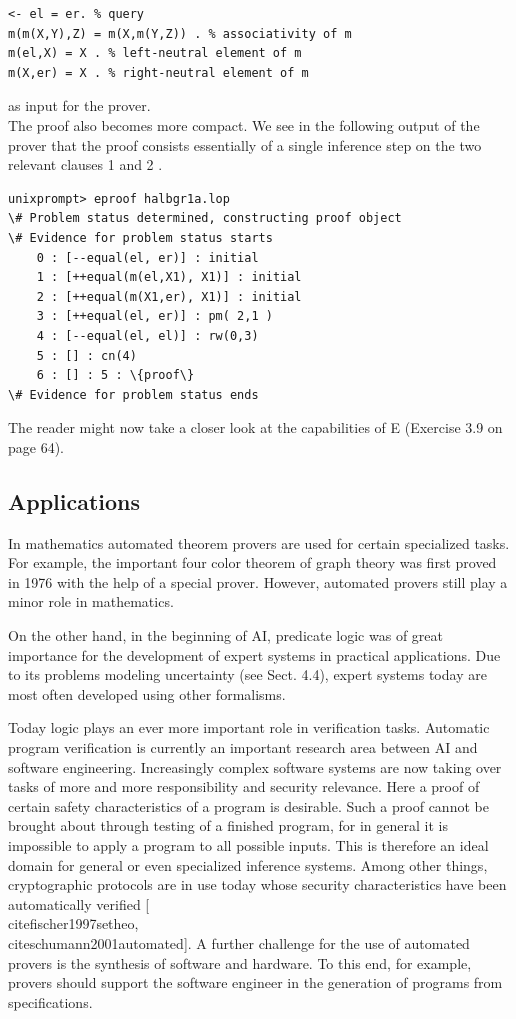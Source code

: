 \documentclass[10pt]{book}
\begin{document}
\begin{verbatim}
<- el = er. % query
m(m(X,Y),Z) = m(X,m(Y,Z)) . % associativity of m
m(el,X) = X . % left-neutral element of m
m(X,er) = X . % right-neutral element of m
\end{verbatim}

as input for the prover.\\
The proof also becomes more compact. We see in the following output of the prover that the proof consists essentially of a single inference step on the two relevant clauses 1 and 2 .

\begin{verbatim}
unixprompt> eproof halbgr1a.lop
\# Problem status determined, constructing proof object
\# Evidence for problem status starts
    0 : [--equal(el, er)] : initial
    1 : [++equal(m(el,X1), X1)] : initial
    2 : [++equal(m(X1,er), X1)] : initial
    3 : [++equal(el, er)] : pm( 2,1 )
    4 : [--equal(el, el)] : rw(0,3)
    5 : [] : cn(4)
    6 : [] : 5 : \{proof\}
\# Evidence for problem status ends
\end{verbatim}

The reader might now take a closer look at the capabilities of E (Exercise 3.9 on page 64).

\subsection*{Applications}
In mathematics automated theorem provers are used for certain specialized tasks. For example, the important four color theorem of graph theory was first proved in 1976 with the help of a special prover. However, automated provers still play a minor role in mathematics.

On the other hand, in the beginning of AI, predicate logic was of great importance for the development of expert systems in practical applications. Due to its problems modeling uncertainty (see Sect. 4.4), expert systems today are most often developed using other formalisms.


Today logic plays an ever more important role in verification tasks. Automatic program verification is currently an important research area between AI and software engineering. Increasingly complex software systems are now taking over tasks of more and more responsibility and security relevance. Here a proof of certain safety characteristics of a program is desirable. Such a proof cannot be brought about through testing of a finished program, for in general it is impossible to apply a program to all possible inputs. This is therefore an ideal domain for general or even specialized inference systems. Among other things, cryptographic protocols are in use today whose security characteristics have been automatically verified [\\cite{fischer1997setheo}, \\cite{schumann2001automated}]. A further challenge for the use of automated provers is the synthesis of software and hardware. To this end, for example, provers should support the software engineer in the generation of programs from specifications.
\end{document}
